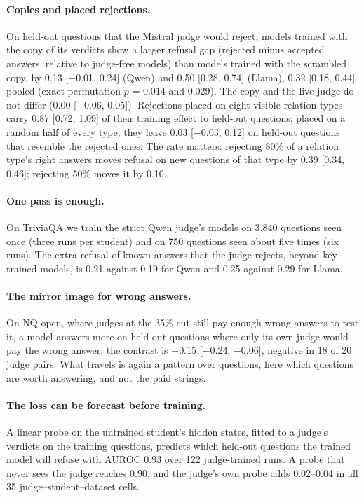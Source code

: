 \paragraph{Copies and placed rejections.} On held-out questions that the Mistral judge would reject, models trained with the copy of its verdicts show a larger refusal gap (rejected minus accepted answers, relative to judge-free models) than models trained with the scrambled copy, by 0.13 [$-$0.01, 0.24] (Qwen) and 0.50 [0.28, 0.74] (Llama), 0.32 [0.18, 0.44] pooled (exact permutation $p$ = 0.014 and 0.029). The copy and the live judge do not differ (0.00 [$-$0.06, 0.05]). Rejections placed on eight visible relation types carry 0.87 [0.72, 1.09] of their training effect to held-out questions; placed on a random half of every type, they leave 0.03 [$-$0.03, 0.12] on held-out questions that resemble the rejected ones. The rate matters: rejecting 80\% of a relation type's right answers moves refusal on new questions of that type by 0.39 [0.34, 0.46]; rejecting 50\% moves it by 0.10.

\paragraph{One pass is enough.} On TriviaQA we train the strict Qwen judge's models on 3{,}840 questions seen once (three runs per student) and on 750 questions seen about five times (six runs). The extra refusal of known answers that the judge rejects, beyond key-trained models, is 0.21 against 0.19 for Qwen and 0.25 against 0.29 for Llama.

\paragraph{The mirror image for wrong answers.} On NQ-open, where judges at the 35\% cut still pay enough wrong answers to test it, a model answers more on held-out questions where only its own judge would pay the wrong answer: the contrast is $-$0.15 [$-$0.24, $-$0.06], negative in 18 of 20 judge pairs. What travels is again a pattern over questions, here which questions are worth answering, and not the paid strings.

\paragraph{The loss can be forecast before training.} A linear probe on the untrained student's hidden states, fitted to a judge's verdicts on the training questions, predicts which held-out questions the trained model will refuse with AUROC 0.93 over 122 judge-trained runs. A probe that never sees the judge reaches 0.90, and the judge's own probe adds 0.02--0.04 in all 35 judge--student--dataset cells.

